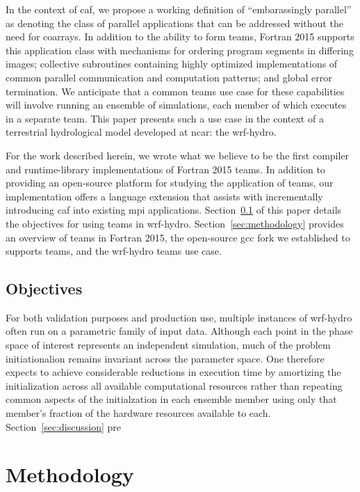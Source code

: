 In the context of \gls{caf}, we propose a working definition of ``embarassingly parallel'' as denoting the class of parallel
applications that can be addressed without the need for \glspl{coarray}.  In addition to the ability to form teams, Fortran
2015 supports this application class with mechanisms for ordering program segments in differing images; collective subroutines
containing highly optimized implementations of common parallel communication and computation patterns; and global error
termination.  We anticipate that a common teams use case for these capabilities will involve running an ensemble of simulations,
each member of which executes in a separate team.  This paper presents such a use case in the context of a terrestrial
hydrological model developed at \gls{ncar}: the \gls{wrf-hydro}.

For the work described herein, we wrote what we believe to be the first compiler and runtime-library implementations of Fortran
2015 teams.  In addition to providing an open-source platform for studying the application of teams, our implementation offers a
language extension that assists with incrementally introducing \gls{caf} into existing \gls{mpi} applications.
Section~\ref{sec:objectives} of this paper details the objectives for using teams in \gls{wrf-hydro}.
Section~\ref{sec:methodology} provides an overview of teams in Fortran 2015, the open-source \gls{gcc} fork we established to
supports teams, and the \gls{wrf-hydro} teams use case.

\subsection{Objectives}\label{sec:objectives}
For both validation purposes and production use, multiple instances of \gls{wrf-hydro} often run on a parametric family of
input data.  Although each point in the phase space of interest represents an independent simulation, much of the problem
initiationalion remains invariant across the parameter space.  One therefore expects to achieve considerable reductions in
execution time by amortizing the initialization across all available computational resources rather than repeating common
aspects of the initialzation in each ensemble member using only that member's fraction of the hardware resources available to
each. Section~\ref{sec:discussion} pre

\section{Methodology}
